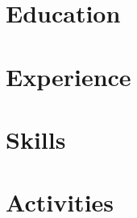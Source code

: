 \documentclass{resume}
\begin{document}
\maketitle

\section{Education}



\section{Experience}



\section{Skills}



\section{Activities}
\end{document}
